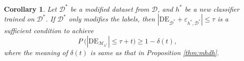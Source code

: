 \documentclass{article}
\newtheorem{corollary}{Corollary}
\begin{document}
\begin{corollary}\label{thm:mh*}
Let $\mathcal{D}^{*}$ be a modified dataset from $\mathcal{D}$, and $h^{*}$ be a new classifier trained on $\mathcal{D}^{*}$. If $\mathcal{D}^{*}$ only modifies the labels, then $\left|\mathrm{DE}_{\mathcal{D}^{*}} \!+\! \varepsilon_{h^{*},\mathcal{D}^{*}}\right| \leq \tau$ is a sufficient condition to achieve
\begin{equation*}
P~ \bigg( \left|\mathrm{DE}_{\mathcal{M}_{h^{*}}}\right| \leq \tau+t \bigg) \geq 1-\delta(t),
\end{equation*}
where the meaning of $\delta(t)$ is same as that in Proposition \ref{thm:mhdh}.
\end{corollary}

%
%
\end{document}

